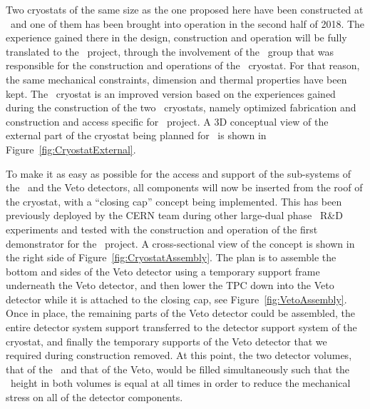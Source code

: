 
Two cryostats of the same size as the one proposed here have been constructed at \CERN\ and one of them has been brought into operation in the second half of 2018. The experience gained there in the design, construction and operation will be fully translated to the \DSks\ project, through the involvement of the \CERN\ group that was responsible for the construction and operations of the \pDUNE\ cryostat. For that reason, the same mechanical constraints, dimension and thermal properties have been kept. The  \DSks\ cryostat is an improved version based on the experiences gained during the construction of the two \pDUNE\ cryostats, namely optimized fabrication and construction and access specific for \DSks\ project. A 3D conceptual view of the external part of the cryostat being planned for \DSks\ is shown in Figure~\ref{fig:CryostatExternal}. 

To make it as easy as possible for the access and support of the sub-systems of the \TPC\ and the Veto detectors, all components will now be inserted from the roof of the cryostat, with a ``closing cap'' concept being implemented. This has been previously deployed by the CERN team during other large-dual phase \TPC\ R\&D experiments and tested with the construction and operation of the first demonstrator for the \pDUNE\ project.  A cross-sectional view of the concept is shown in the right side of Figure~\ref{fig:CryostatAssembly}.  The plan is to assemble the bottom and sides of the Veto detector using a temporary support frame underneath the Veto detector, and then lower the TPC down into the Veto detector while it is attached to the closing cap, see Figure~\ref{fig:VetoAssembly}.  Once in place, the remaining parts of the Veto detector could be assembled, the entire detector system support transferred to the detector support system of the cryostat, and finally the temporary supports of the Veto detector that we required during construction removed.  At this point, the two detector volumes, that of the \TPC\ and that of the Veto, would be filled simultaneously such that the \LAr\ height in both volumes is equal at all times in order to reduce the mechanical stress on all of the detector components.

